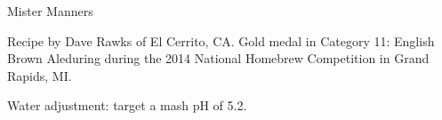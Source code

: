\begin{recipe}{Mister Manners} %

\begin{aboutblock}
Recipe by Dave Rawks of El Cerrito, CA. Gold medal in Category 11: English Brown
Aleduring during the 2014 National Homebrew Competition in Grand Rapids, MI.
\sourceaha
\end{aboutblock}


\begin{methodandtiming}

\begin{mashsteps}
\end{mashsteps}

\begin{fermentationsteps}
\end{fermentationsteps}

\begin{directions}
Water adjustment: target a mash pH of 5.2.
\end{directions}

\end{methodandtiming}

\recipebreak

\begin{ingredientsblock}

\begin{malts}
\end{malts}

\begin{hops}
\end{hops}


\end{ingredientsblock}

\end{recipe}

